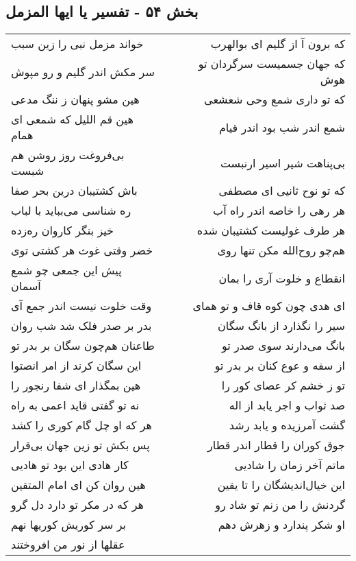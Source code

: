 \begin{center}
\section*{بخش ۵۴ - تفسیر یا ایها المزمل}
\label{sec:sh054}
\begin{longtable}{l p{0.5cm} r}
خواند مزمل نبی را زین سبب
&&
که برون آ از گلیم ای بوالهرب
\\
سر مکش اندر گلیم و رو مپوش
&&
که جهان جسمیست سرگردان تو هوش
\\
هین مشو پنهان ز ننگ مدعی
&&
که تو داری شمع وحی شعشعی
\\
هین قم اللیل که شمعی ای همام
&&
شمع اندر شب بود اندر قیام
\\
بی‌فروغت روز روشن هم شبست
&&
بی‌پناهت شیر اسیر ارنبست
\\
باش کشتیبان درین بحر صفا
&&
که تو نوح ثانیی ای مصطفی
\\
ره شناسی می‌بباید با لباب
&&
هر رهی را خاصه اندر راه آب
\\
خیز بنگر کاروان ره‌زده
&&
هر طرف غولیست کشتیبان شده
\\
خضر وقتی غوث هر کشتی توی
&&
هم‌چو روح‌الله مکن تنها روی
\\
پیش این جمعی چو شمع آسمان
&&
انقطاع و خلوت آری را بمان
\\
وقت خلوت نیست اندر جمع آی
&&
ای هدی چون کوه قاف و تو همای
\\
بدر بر صدر فلک شد شب روان
&&
سیر را نگذارد از بانگ سگان
\\
طاعنان هم‌چون سگان بر بدر تو
&&
بانگ می‌دارند سوی صدر تو
\\
این سگان کرند از امر انصتوا
&&
از سفه و عوع کنان بر بدر تو
\\
هین بمگذار ای شفا رنجور را
&&
تو ز خشم کر عصای کور را
\\
نه تو گفتی قاید اعمی به راه
&&
صد ثواب و اجر یابد از اله
\\
هر که او چل گام کوری را کشد
&&
گشت آمرزیده و یابد رشد
\\
پس بکش تو زین جهان بی‌قرار
&&
جوق کوران را قطار اندر قطار
\\
کار هادی این بود تو هادیی
&&
ماتم آخر زمان را شادیی
\\
هین روان کن ای امام المتقین
&&
این خیال‌اندیشگان را تا یقین
\\
هر که در مکر تو دارد دل گرو
&&
گردنش را من زنم تو شاد رو
\\
بر سر کوریش کوریها نهم
&&
او شکر پندارد و زهرش دهم
\\
عقلها از نور من افروختند
&&

\end{longtable}
\end{center}
